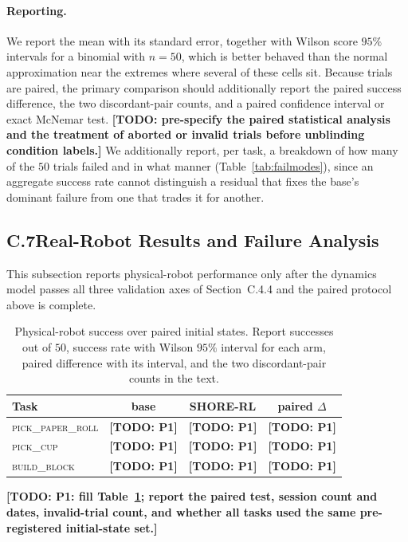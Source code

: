 \documentclass[letterpaper]{article} %
\newcommand{\todo}[1]{\textbf{[TODO: #1]}}
\begin{document}
\paragraph{Reporting.}
We report the mean with its standard error, together with Wilson score $95\%$
intervals for a binomial with $n=50$, which is better behaved than the normal
approximation near the extremes where several of these cells sit. Because trials are
paired, the primary comparison should additionally report the paired success difference,
the two discordant-pair counts, and a paired confidence interval or exact McNemar test.
\todo{pre-specify the paired statistical analysis and the treatment of aborted or invalid
trials before unblinding condition labels.} We additionally report, per task, a breakdown
of how many of the $50$ trials failed and in what
manner (Table~\ref{tab:failmodes}), since an aggregate success rate cannot
distinguish a residual that fixes the base's dominant failure from one that
trades it for another.

\subsection{C.7\quad Real-Robot Results and Failure Analysis}

This subsection reports physical-robot performance only after the dynamics model passes
all three validation axes of Section~C.4.4 and the paired protocol above is complete.

\begin{table}[t]
\centering\small\setlength{\tabcolsep}{4pt}
\begin{tabular}{@{}lccc@{}}
\toprule
Task & base & \textbf{SHORE-RL} & paired $\Delta$ \\
\midrule
\textsc{pick\_paper\_roll} & \todo{P1} & \todo{P1} & \todo{P1} \\
\textsc{pick\_cup}         & \todo{P1} & \todo{P1} & \todo{P1} \\
\textsc{build\_block}      & \todo{P1} & \todo{P1} & \todo{P1} \\
\bottomrule
\end{tabular}
\caption{Physical-robot success over paired initial states. Report successes out of $50$,
success rate with Wilson $95\%$ interval for each arm, paired difference with its interval,
and the two discordant-pair counts in the text.}
\label{tab:realresults}
\end{table}

\todo{P1: fill Table~\ref{tab:realresults}; report the paired test, session count and dates,
invalid-trial count, and whether all tasks used the same pre-registered initial-state set.}
\end{document}
